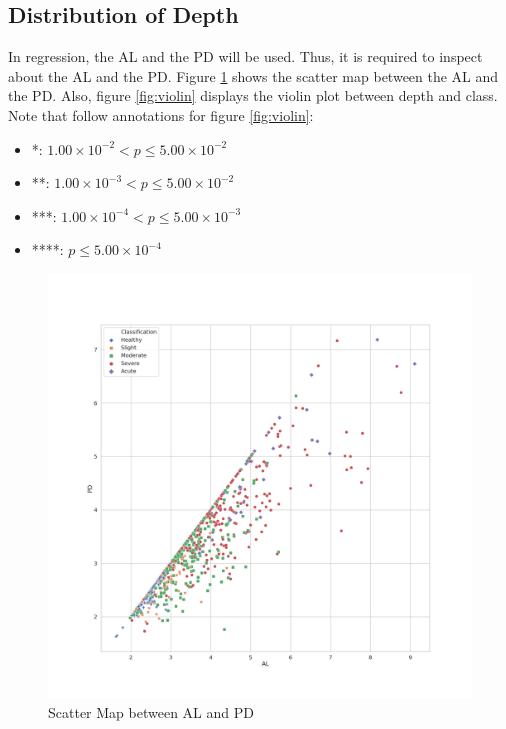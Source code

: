 \documentclass[aps, 11pt, a4paper]{article}
\begin{document}
    	\subsection{Distribution of Depth}
			In regression, the AL and the PD will be used. Thus, it is required to inspect about the AL and the PD. Figure \ref{fig:scatter} shows the scatter map between the AL and the PD. Also, figure \ref{fig:violin} displays the violin plot between depth and class. Note that follow annotations for figure \ref{fig:violin}:
			\begin{itemize}
				\item *: $1.00 \times 10^{-2} < p \leq 5.00 \times 10^{-2}$
				\item **: $1.00 \times 10^{-3} < p \leq 5.00 \times 10^{-2}$
				\item ***: $1.00 \times 10^{-4} < p \leq 5.00 \times 10^{-3}$
				\item ****: $p \leq 5.00 \times 10^{-4}$
			\end{itemize}
    		
    		\begin{figure}[htbp]
				\centering
				\includegraphics[width=0.5 \linewidth]{figures/scatter.png}
				\caption{Scatter Map between AL and PD}
				\label{fig:scatter}
    		\end{figure}
    	
\end{document}
